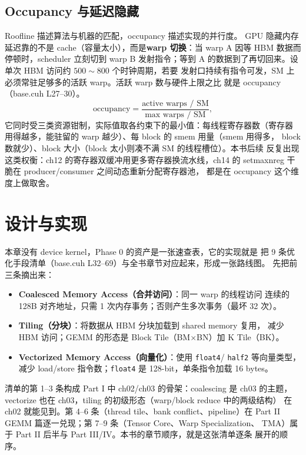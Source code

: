 \subsection{Occupancy 与延迟隐藏}

Roofline 描述算法与机器的匹配，occupancy 描述实现的并行度。
GPU 隐藏内存延迟靠的不是 cache（容量太小），而是\textbf{warp 切换}：当
warp A 因等 HBM 数据而停顿时，scheduler 立刻切到 warp B 发射指令；等到
A 的数据到了再切回来。设单次 HBM 访问约 $500 \sim 800$ 个时钟周期，若要
发射口持续有指令可发，SM 上必须常驻足够多的活跃 warp。活跃 warp 数与硬件上限之比
就是 occupancy（base.cuh L27--30）。
\begin{equation}
  \mathrm{occupancy} = \frac{\text{active warps / SM}}
                            {\text{max warps / SM}},
\end{equation}
它同时受三类资源钳制，实际值取各约束下的最小值：每线程寄存器数（寄存器
用得越多，能驻留的 warp 越少）、每 block 的 smem 用量（smem 用得多，
block 数就少）、block 大小（block 太小则凑不满 SM 的线程槽位）。本书后续
反复出现这类权衡：ch12 的寄存器双缓冲用更多寄存器换流水线，ch14 的
setmaxnreg 干脆在 producer/consumer 之间动态重新分配寄存器池，
都是在 occupancy 这个维度上做取舍。

\section{设计与实现}

本章没有 device kernel，Phase 0 的资产是一张速查表，它的实现就是
把 9 条优化手段清单（base.cuh L32--69）与全书章节对应起来，形成一张路线图。
先把前三条摘出来：

\begin{itemize}
\item \textbf{Coalesced Memory Access（合并访问）}：同一 warp 的线程访问
  连续的 128B 对齐地址，只需 1 次内存事务；否则产生多次事务（最坏 32 次）。
\item \textbf{Tiling（分块）}：将数据从 HBM 分块加载到 shared memory 复用，
  减少 HBM 访问；GEMM 的形态是 Block Tile（BM$\times$BN）加 K Tile（BK）。
\item \textbf{Vectorized Memory Access（向量化）}：使用 \texttt{float4}/
  \texttt{half2} 等向量类型，减少 load/store 指令数；\texttt{float4} 是
  128-bit，单条指令加载 16 bytes。
\end{itemize}

清单的第 1--3 条构成 Part I 中 ch02/ch03 的骨架：coalescing 是 ch03 的主题，
vectorize 也在 ch03，tiling 的初级形态（warp/block reduce 中的两级结构）
在 ch02 就能见到。第 4--6 条（thread tile、bank conflict、pipeline）在
Part II GEMM 篇逐一兑现；第 7--9 条（Tensor Core、Warp Specialization、
TMA）属于 Part II 后半与 Part III/IV。本书的章节顺序，就是这张清单逐条
展开的顺序。

